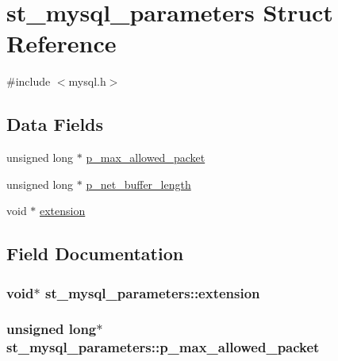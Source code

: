\hypertarget{structst__mysql__parameters}{}\section{st\+\_\+mysql\+\_\+parameters Struct Reference}
\label{structst__mysql__parameters}


{\ttfamily \#include $<$mysql.\+h$>$}

\subsection*{Data Fields}
\begin{DoxyCompactItemize}
\item 
unsigned long $\ast$ \hyperlink{structst__mysql__parameters_aec6c53b7d891b000b422028a993dcf22}{p\+\_\+max\+\_\+allowed\+\_\+packet}
\item 
unsigned long $\ast$ \hyperlink{structst__mysql__parameters_a9444966bdb70fba3bbf63b75c5ec0445}{p\+\_\+net\+\_\+buffer\+\_\+length}
\item 
void $\ast$ \hyperlink{structst__mysql__parameters_a794dd694b9453f1da8d117bb8ad6ca1a}{extension}
\end{DoxyCompactItemize}


\subsection{Field Documentation}
\hypertarget{structst__mysql__parameters_a794dd694b9453f1da8d117bb8ad6ca1a}{}
\subsubsection[{extension}]{\setlength{\rightskip}{0pt plus 5cm}void$\ast$ st\+\_\+mysql\+\_\+parameters\+::extension}\label{structst__mysql__parameters_a794dd694b9453f1da8d117bb8ad6ca1a}
\hypertarget{structst__mysql__parameters_aec6c53b7d891b000b422028a993dcf22}{}
\subsubsection[{p\+\_\+max\+\_\+allowed\+\_\+packet}]{\setlength{\rightskip}{0pt plus 5cm}unsigned long$\ast$ st\+\_\+mysql\+\_\+parameters\+::p\+\_\+max\+\_\+allowed\+\_\+packet}\label{structst__mysql__parameters_aec6c53b7d891b000b422028a993dcf22}
\hypertarget{structst__mysql__parameters_a9444966bdb70fba3bbf63b75c5ec0445}{}
